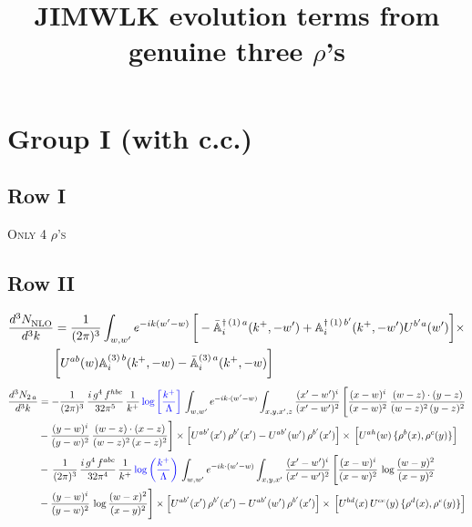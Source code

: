 \documentclass[9pt]{article}
\title{JIMWLK evolution terms from genuine three $\rho$'s}
\author{}
\date{}
\def\mf#1{\mathbb{#1}}
\numberwithin{equation}{section}
\begin{document}
\maketitle
\section{Group I (with c.c.)}
\subsection{Row I}
\textsc{Only 4 $\rho$'s}
\subsection{Row II}
\begin{align}
    \frac{d^{3}N_{\rm NLO}^{\rm}}{d^{3}k} &  = \frac{1}{(2\pi)^{3}}  \int_{w, w^\prime} e^{-ik(w^\prime-w)}\,\bigg[-\bar{\mf{A}}^{\dagger\,(1)\,a}_{i}(k^{+},-w^{\prime})+\mf{A}^{\dagger\, (1)\, b^{\prime}}_{i}(k^{+},-w^{\prime})U^{b^{\prime}a}(w^{\prime})\bigg]\times \notag \\ & \bigg[U^{ab}(w)\mf{A}^{(3)\, b}_{i}(k^{+},- w)-\Bar{\mf{A}}^{(3)\, a}_{i}(k^{+}, - w)\bigg]\nonumber
\end{align}
\begin{align}
    \frac{d^{3}N_{2\,a}}{d^{3}k} & = -\frac{1}{(2\pi)^{3}}\,\frac{i\,g^{4}\,f^{hbc}}{32\pi^{5}}\,\frac{1}{k^{+}}\,{\color{blue}\log{\left[\frac{k^{+}}{\Lambda}\right]}}\,
\int_{w,w'} e^{-ik\cdot(w'-w)}\int_{x,y,x',z}\frac{(x'-w')^{i}}{(x'-w')^{2}}\,\Bigg[\frac{(x-w)^{i}}{(x-w)^{2}}\, \frac{(w-z)\cdot (y-z)}{(w-z)^{2}\,(y-z)^{2}}\notag \\ & - \frac{(y-w)^{i}}{(y-w)^{2}}\, \frac{(w-z)\cdot (x-z)}{(w-z)^{2}\,(x-z)^{2}}\Bigg]\times\Big[U^{ab'}(x')\,\rho^{b'}(x')-U^{ab'}(w')\,\rho^{b'}(x')\Big]\times\, \Big[U^{ah}(w)\,\{\rho^{b}(x),\rho^{c}(y)\}\Big]\notag \\ &  -\,\frac{1}{(2\pi)^{3}}\,\frac{i\,g^{4}\,f^{abc}}{32\pi^{4}}\,\frac{1}{k^{+}}\,{\color{blue}\log\left(\frac{k^{+}}{\Lambda}\right)}\,
\int_{w,w'} e^{-ik\cdot(w'-w)}\int_{x,y,x'}\frac{(x'-w')^{i}}{(x'-w')^{2}}\,\Bigg[\frac{(x-w)^{i}}{(x-w)^{2}}\,\log\frac{(w-y)^{2}}{(x-y)^{2}}\notag \\ & -\frac{(y-w)^{i}}{(y-w)^{2}}\,\log\frac{(w-x)^{2}}{(x-y)^{2}}\Bigg]\times \Big[U^{ab'}(x')\,\rho^{b'}(x')-U^{ab'}(w')\,\rho^{b'}(x')\Big]\times\, \Big[U^{bd}(x)\,U^{ce}(y)\,\{\rho^{d}(x),\rho^{e}(y)\}\Big]
\end{align}
\end{document}
